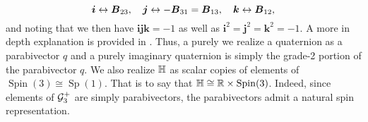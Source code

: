 \begin{equation}
\boldsymbol{i} \leftrightarrow \boldsymbol{B}_{23}, \quad \boldsymbol{j} \leftrightarrow -\boldsymbol{B}_{31}=\boldsymbol{B}_{13}, \quad \boldsymbol{k} \leftrightarrow \boldsymbol{B}_{12},
\end{equation}
and noting that we then have $\boldsymbol{ijk}=-1$ as well as $\boldsymbol{i}^2=\boldsymbol{j}^2=\boldsymbol{k}^2=-1$. A more in depth explanation is provided in \cite{doran_geometric_2003}. Thus, a purely we realize a quaternion as a parabivector $q$ and a purely imaginary quaternion is simply the grade-2 portion of the parabivector $q$. We also realize $\mathbb{H}$ as scalar copies of elements of $\operatorname{Spin}(3) \cong \operatorname{Sp}(1)$. That is to say that $\mathbb{H} \cong \mathbb{R} \times \operatorname{Spin}(3)$. Indeed, since elements of $\mathcal{G}_3^+$ are simply parabivectors, the parabivectors admit a natural spin representation.

